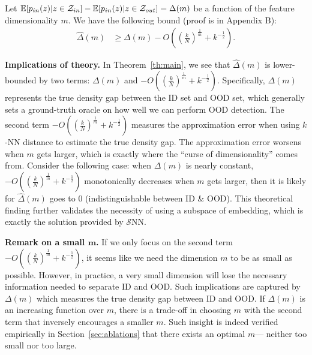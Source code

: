 \begin{theorem} Let $\mathbb{E}[p_{in}(\*z)|{\*z \in \mathcal{Z}_{in}}] - \mathbb{E}[p_{in}(\*z)|{\*z \in \mathcal{Z}_{out}}] = \Delta(m)$ be a function of the feature dimensionality $m$. We have the following bound (proof is in Appendix B): 
\begin{align}
            \hat{\Delta}(m) & \geq \Delta(m) - 
            O\left((\frac{k}{N})^{\frac{1}{m}} + k^{-\frac{1}{2}}\right).
    \end{align}

\label{th:main}
\end{theorem}


\noindent \textbf{Implications of theory.} 
In Theorem~\ref{th:main}, we see that $\hat{\Delta}(m)$ is lower-bounded by two terms: $\Delta(m)$ and $-O\left((\frac{k}{N})^{\frac{1}{m}} + k^{-\frac{1}{2}}\right)$. Specifically, $\Delta(m)$ represents the true density gap between the ID set and OOD set, which generally sets a ground-truth oracle on how well we can perform OOD detection.  The second term $-O\left((\frac{k}{N})^{\frac{1}{m}} + k^{-\frac{1}{2}}\right)$ measures the approximation error 
when using $k$-NN distance to estimate the true density gap. The approximation error worsens when $m$ gets larger,  which is { exactly where the ``curse of dimensionality'' comes from}.  Consider the following case: when $\Delta(m)$ is nearly constant, $-O\left((\frac{k}{N})^{\frac{1}{m}} + k^{-\frac{1}{2}}\right)$  monotonically decreases when $m$ gets larger, then it is likely for $\hat{\Delta}(m)$ goes to 0 (indistinguishable between ID \& OOD). This theoretical finding further validates the necessity of using a subspace of embedding, which is exactly the solution provided by $\mathcal{S}$NN.

\vspace{0.2cm}
\noindent \textbf{Remark on a small $\mathbf{m}$.} If we only focus on the second term $-O\left((\frac{k}{N})^{\frac{1}{m}} + k^{-\frac{1}{2}}\right)$, it seems like we need the dimension $m$ to be as small as possible. However, in practice, a very small dimension will lose the necessary information needed to separate ID and OOD. Such implications are captured by $\Delta(m)$ which measures the true density gap between ID and OOD. If $\Delta(m)$ is an increasing function over $m$, there is a trade-off in choosing $m$ with the second term that inversely encourages a smaller $m$. Such insight is indeed verified empirically in Section~\ref{sec:ablations} that there exists an optimal $m$--- neither too small nor too large.  